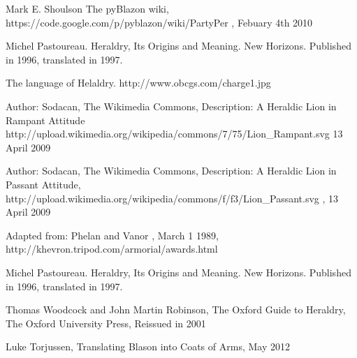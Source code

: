 \begin{thebibliography}{100}

  	Mark E. Shoulson
 	The pyBlazon wiki, 
 	https://code.google.com/p/pyblazon/wiki/PartyPer , 
 	Febuary 4th 2010


	Michel Pastoureau. 
	Heraldry, Its Origins and Meaning.
	New Horizons. 
	Published in 1996, translated in 1997.


	The language of Helaldry.
	http://www.obcgs.com/charge1.jpg

	Author: Sodacan,  
	The Wikimedia Commons,
	Description: A Heraldic Lion in Rampant Attitude
	http://upload.wikimedia.org/wikipedia/commons/7/75/Lion\_Rampant.svg
	13 April 2009

	Author: Sodacan,
	The Wikimedia Commons, 
	Description: A Heraldic Lion in Passant Attitude, 
	http://upload.wikimedia.org/wikipedia/commons/f/f3/Lion\_Passant.svg ,
	13 April 2009
	
	Adapted from: 
	Phelan and Vanor , 
	March 1 1989, 
	http://khevron.tripod.com/armorial/awards.html


	Michel Pastoureau. 
	Heraldry, Its Origins and Meaning.
	New Horizons. 
	Published in 1996, translated in 1997.


	Thomas Woodcock and John Martin Robinson, 
	The Oxford Guide to Heraldry, 
	The Oxford University Press, 
	Reissued in 2001


	Luke Torjussen, 
	Translating Blason into Coats of Arms, 
	May 2012


\end{thebibliography}